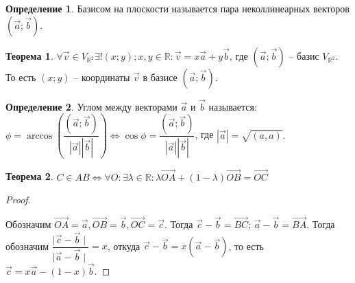 \documentclass[12pt]{article}
\theoremstyle{definition}
\newtheorem{theorem}{Теорема}[section]
\newtheorem{definition}{Определение}
\newcommand{\R}{\mathbb{R}}
\begin{document}
\begin{definition}
    Базисом на плоскости называется пара неколлинеарных векторов $(\Vec{a};\Vec{b}).$
\end{definition}

\begin{theorem}
    $\forall \Vec{\textit{v}}\in V_{\R^2} \exists!(x;y);x,y\in \R: \Vec{\textit{v}}=x\Vec{a}+y\Vec{b}$, где $(\Vec{a};\Vec{b})$ -- базис $V_{\R^2}.$ То есть $(x;y)$ -- координаты $\Vec{\textit{v}}$ в базисе $(\Vec{a};\Vec{b}).$
\end{theorem}

\begin{definition}
    Углом между векторами $\Vec{a}$ и $\Vec{b}$ называется: $\phi=\arccos \left( \dfrac{(\Vec{a};\Vec{b})}{|\Vec{a}||\Vec{b}|}\right)\Longleftrightarrow \cos \phi = \dfrac{(\Vec{a};\Vec{b})}{|\Vec{a}||\Vec{b}|}$, где $|\Vec{a}|=\sqrt{(a,a)}.$
\end{definition}

\begin{theorem}
    $C\in AB \Longleftrightarrow \forall O: \exists \lambda \in \R: \lambda \overrightarrow{OA}+(1-\lambda) \overrightarrow{OB}=\overrightarrow{OC}$
\end{theorem}
    \begin{proof}
    $ $\newline
    \begin{center}
    \end{center}
        Обозначим $\overrightarrow{OA}=\Vec{a},\overrightarrow{OB}=\Vec{b},\overrightarrow{OC}=\Vec{c}$. Тогда $\Vec{c}-\Vec{b}=\overrightarrow {BC}$; $\Vec{a}-\Vec{b}=\overrightarrow{BA}$. Тогда обозначим $\dfrac{\mid \Vec{c}-\Vec{b}\mid }{\mid \Vec{a}-\Vec{b}\mid }=x$, откуда $\Vec{c}-\Vec{b}=x(\Vec{a}-\Vec{b})$, то есть $\Vec{c}=x\Vec{a}-(1-x)\Vec{b}$.
    \end{proof}
\end{document}
